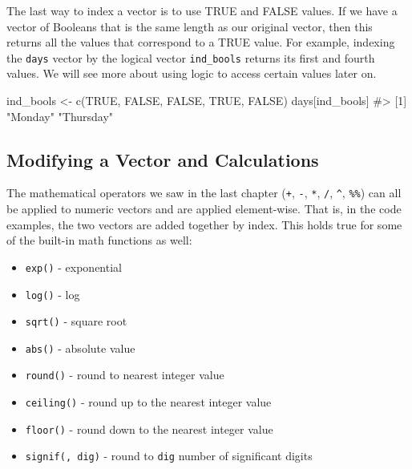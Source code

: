\documentclass[
  letterpaper,
]{latex/krantz}
\makeatletter
\newenvironment{Shaded}{\begin{snugshade}}{\end{snugshade}}
\newcommand{\CommentTok}[1]{\textcolor[rgb]{0.37,0.37,0.37}{#1}}
\newcommand{\ConstantTok}[1]{\textcolor[rgb]{0.56,0.35,0.01}{#1}}
\newcommand{\FunctionTok}[1]{\textcolor[rgb]{0.28,0.35,0.67}{#1}}
\newcommand{\NormalTok}[1]{\textcolor[rgb]{0.00,0.23,0.31}{#1}}
\newcommand{\OtherTok}[1]{\textcolor[rgb]{0.00,0.23,0.31}{#1}}
\providecommand{\tightlist}{%
  \setlength{\itemsep}{0pt}\setlength{\parskip}{0pt}}\usepackage{longtable,booktabs,array}
\newenvironment{kframe}{%
\medskip{}
\setlength{\fboxsep}{.8em}
 \def\at@end@of@kframe{}%
 \ifinner\ifhmode%
  \def\at@end@of@kframe{\end{minipage}}%
  \begin{minipage}{\columnwidth}%
 \fi\fi%
 \def\FrameCommand##1{\hskip\@totalleftmargin \hskip-\fboxsep
 \colorbox{shadecolor}{##1}\hskip-\fboxsep
     \hskip-\linewidth \hskip-\@totalleftmargin \hskip\columnwidth}%
 \MakeFramed {\advance\hsize-\width
   \@totalleftmargin\z@ \linewidth\hsize
   \@setminipage}}%
 {\par\unskip\endMakeFramed%
 \at@end@of@kframe}
\renewenvironment{Shaded}{\begin{kframe}}{\end{kframe}}
\makeatother
\begin{document}
The last way to index a vector is to use TRUE and FALSE values. If we
have a vector of Booleans that is the same length as our original
vector, then this returns all the values that correspond to a TRUE
value. For example, indexing the \texttt{days} vector by the logical
vector \texttt{ind\_bools} returns its first and fourth values. We will
see more about using logic to access certain values later on.

\begin{Shaded}
\begin{Highlighting}[]
\NormalTok{ind\_bools }\OtherTok{\textless{}{-}} \FunctionTok{c}\NormalTok{(}\ConstantTok{TRUE}\NormalTok{, }\ConstantTok{FALSE}\NormalTok{, }\ConstantTok{FALSE}\NormalTok{, }\ConstantTok{TRUE}\NormalTok{, }\ConstantTok{FALSE}\NormalTok{)}
\NormalTok{days[ind\_bools]}
\CommentTok{\#\textgreater{} [1] "Monday"   "Thursday"}
\end{Highlighting}
\end{Shaded}

\subsection{\texorpdfstring{Modifying a Vector and Calculations
}{Modifying a Vector and Calculations }}\label{modifying-a-vector-and-calculations}

The mathematical operators we saw in the last chapter (\texttt{+},
\texttt{-}, \texttt{*}, \texttt{/}, \texttt{\^{}}, \texttt{\%\%}) can
all be applied to numeric vectors and are applied element-wise. That is,
in the code examples, the two vectors are added together by index. This
holds true for some of the built-in math functions as well:

\begin{itemize}
\tightlist
\item
  \texttt{exp()} - exponential 
\item
  \texttt{log()} - log 
\item
  \texttt{sqrt()} - square root
\item
  \texttt{abs()} - absolute value
\item
  \texttt{round()} - round to nearest integer value
\item
  \texttt{ceiling()} - round up to the nearest integer value
\item
  \texttt{floor()} - round down to the nearest integer value
\item
  \texttt{signif(,\ dig)} - round to \texttt{dig} number of significant
  digits 
\end{itemize}
\end{document}
